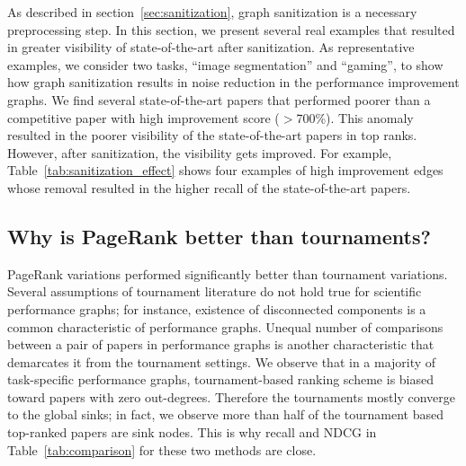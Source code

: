 \documentclass[runningheads]{llncs}
\begin{document}
As described in section~\ref{sec:sanitization}, graph sanitization is a necessary preprocessing step. In this section, we present several real examples that resulted in greater visibility of state-of-the-art after sanitization. As representative examples, we consider two tasks, ``image segmentation'' and ``gaming'', to show how graph sanitization results in noise reduction in the performance improvement graphs. We find several state-of-the-art papers that performed poorer than a competitive paper with high improvement score ($>$700\%). This anomaly resulted in the poorer visibility of the state-of-the-art papers in top ranks. However, after sanitization, the visibility gets improved. For example, Table~\ref{tab:sanitization_effect} shows four examples of high improvement edges whose removal resulted in the higher recall of the state-of-the-art papers. %

\begin{table}[h]
\centering
  \caption{Effect of graph sanitization. The first two edges correspond to the task of ``image segmentation'' and the last two to the task of ``gaming''. Removal of these edges resulted in higher visibility of SOTA papers.}
  \label{tab:sanitization_effect}
\end{table}


\subsection{Why is PageRank better than tournaments?}

PageRank variations performed significantly better than tournament variations. Several assumptions of tournament literature do not hold true for scientific performance graphs; for instance, existence of disconnected components is a common characteristic of performance graphs. Unequal number of comparisons between a pair of papers in performance graphs is another characteristic that demarcates it from the tournament settings. We observe that in a majority of task-specific performance graphs, tournament-based ranking scheme is biased toward papers with zero out-degrees. Therefore the tournaments mostly converge to the global sinks; in fact, we observe more than half of the tournament based top-ranked papers are sink nodes.  This is why recall and NDCG in Table~\ref{tab:comparison} for these two methods are close. 
\end{document}
